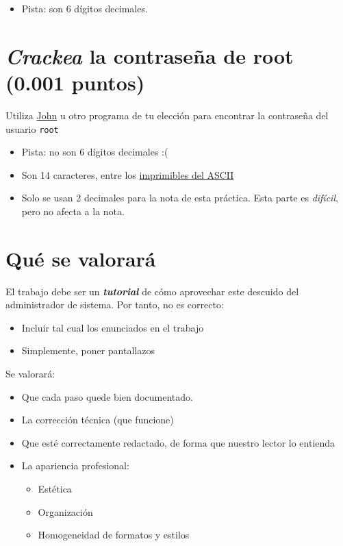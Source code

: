 \documentclass[a4paper]{article}
\begin{document}
\begin{Aviso}[Pista]
\begin{itemize}
\item Pista: son 6 dígitos decimales.
\end{itemize}
\end{Aviso}
\section{\emph{Crackea} la contraseña de root (0.001 puntos)}
\label{sec:org000000c}
Utiliza \href{https://www.openwall.com/john/}{John} u otro programa de tu elección para encontrar la contraseña del usuario \texttt{root}

\begin{Aviso}[Pista]
\begin{itemize}
\item Pista: no son 6 dígitos decimales :(
\item Son 14 caracteres, entre los \href{https://en.wikipedia.org/wiki/ASCII\#Character\_set}{imprimibles del ASCII}
\item Solo se usan 2 decimales para la nota de esta práctica. Esta parte es \emph{difícil}, pero no afecta a la nota.
\end{itemize}
\end{Aviso}
\section*{Qué se valorará}
\label{sec:org000000f}
El trabajo debe ser un \emph{\textbf{tutorial}} de cómo aprovechar este descuido del administrador de sistema. Por tanto, no es correcto:
\begin{itemize}
\item Incluir tal cual los enunciados en el trabajo
\item Simplemente, poner pantallazos
\end{itemize}


Se valorará:
\begin{itemize}
\item Que cada paso quede bien documentado.
\item La corrección técnica (que funcione)
\item Que esté correctamente redactado, de forma que nuestro lector lo entienda
\item La apariencia profesional:
\begin{itemize}
\item Estética
\item Organización
\item Homogeneidad de formatos y estilos
\end{itemize}
\end{itemize}
\end{document}
